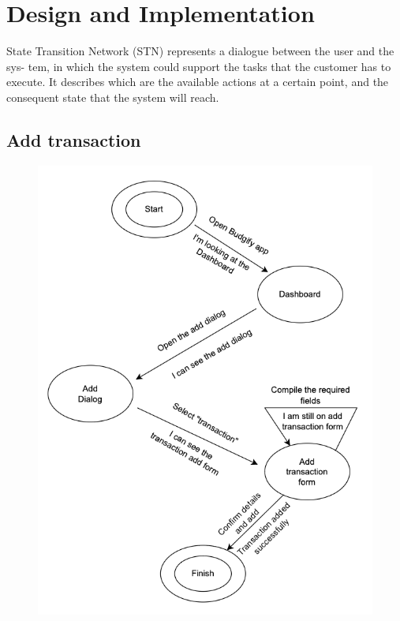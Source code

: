 \documentclass[a4paper,12pt]{article}
\begin{document}
\section{Design and Implementation}
State Transition Network (STN) represents a dialogue between the user and the sys-
tem, in which the system could support the tasks that the customer has to execute. It describes
which are the available actions at a certain point, and the consequent state that the system will reach.
\subsection{Add transaction}
\begin{figure}[H]
    \centering
    \includegraphics[scale=0.4]{STN1.png}
\end{figure}
\end{document}
